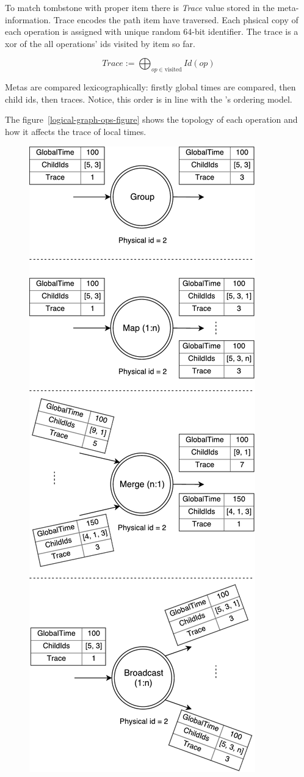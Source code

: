 To match tombstone with proper item there is {\it Trace} value stored in the meta-information. Trace encodes the path item have traversed. Each phsical copy of each operation is assigned with unique random 64-bit identifier. The trace is a xor of the all operations' ids visited by item so far.

\[Trace := \bigoplus_{op \in \text{visited}} Id(op)\]

Metas are compared lexicographically: firstly global times are compared, then child ids, then traces. Notice, this order is in line with the \FlameStream's ordering model.

The figure~\ref{logical-graph-ops-figure} shows the topology of each operation and how it affects the trace of local times.

\begin{figure}[htbp]
  \centering
  \includegraphics[scale=0.5]{pics/operations}

\end{figure}
